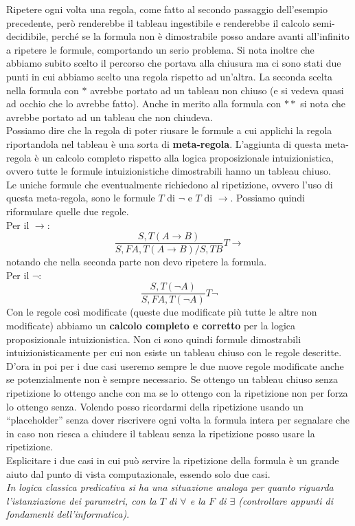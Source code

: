 \documentclass[a4paper,12pt, oneside]{book}
\begin{document}
Ripetere ogni volta una regola, come fatto al secondo passaggio dell'esempio
precedente, però renderebbe 
il tableau ingestibile e renderebbe il calcolo semi-decidibile, perché se la
formula non è dimostrabile posso andare avanti all'infinito a ripetere le
formule, comportando un serio problema. Si nota inoltre che abbiamo subito
scelto il percorso che portava alla chiusura ma ci sono stati due punti in cui
abbiamo scelto una regola rispetto ad un'altra. La seconda scelta nella formula
con $*$ avrebbe portato ad un tableau non chiuso (e si vedeva quasi ad occhio
che lo avrebbe fatto). Anche in merito alla formula con $**$ si nota che avrebbe
portato ad un tableau che non chiudeva. \\ 
Possiamo dire che la regola di poter riusare le formule a cui applichi la regola
riportandola nel tableau è una sorta di \textbf{meta-regola}. L'aggiunta di
questa meta-regola è un calcolo completo rispetto alla logica proposizionale
intuizionistica, ovvero tutte le formule intuizionistiche dimostrabili hanno un
tableau chiuso.\\
Le uniche formule che eventualmente richiedono al ripetizione, ovvero l'uso di
questa meta-regola, sono le formule $T$ di $\neg$ e $T$ di $\to$. Possiamo
quindi riformulare quelle due regole.\\
Per il $\to$:
\[\frac{S,T(A\to B)}{S,FA,T(A\to B)/S,TB}T\to\]
notando che nella seconda parte non devo ripetere la formula.\\
Per il $\neg$:
\[\frac{S,T(\neg A)}{S,FA,T(\neg A)}T\neg\]
Con le regole così modificate (queste due modificate più tutte le altre non
modificate) abbiamo un \textbf{calcolo completo e corretto} per la 
logica proposizionale intuizionistica. Non ci sono quindi formule dimostrabili
intuizionisticamente per cui non esiste un tableau chiuso con le regole
descritte. D'ora in poi per i due casi useremo sempre le due nuove regole
modificate anche se potenzialmente non è sempre necessario. Se ottengo un
tableau chiuso senza ripetizione lo ottengo anche con ma se lo ottengo con la
ripetizione non per forza lo ottengo senza. Volendo posso ricordarmi della
ripetizione usando un ``placeholder'' senza dover riscrivere ogni volta la
formula intera  per segnalare che in caso non riesca a
chiudere il tableau senza la ripetizione posso usare la ripetizione.\\ 
Esplicitare i due casi in cui può servire la ripetizione della formula è un
grande aiuto dal punto di vista computazionale, essendo solo due casi.\\
\textit{In logica classica predicativa si ha una situazione analoga per quanto
  riguarda l'istanziazione dei parametri, con la $T$ di $\forall$ e la $F$ di
  $\exists$ (\emph{controllare appunti di fondamenti dell'informatica})}.\\
\end{document}
